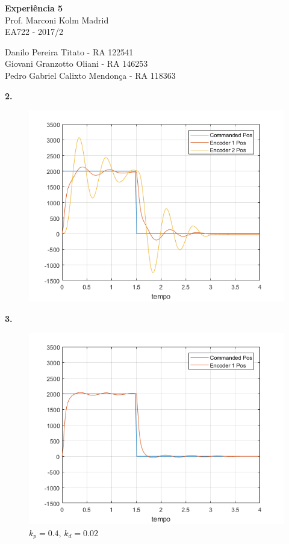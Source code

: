 \documentclass[a4paper,11pt]{article}
\begin{document}
	

\begin{center}
\textbf{Experiência 5} \\
\hspace{5pt}
Prof. Marconi Kolm Madrid \\
EA722 - 2017/2
\end{center}

\begin{center}
Danilo Pereira Titato - RA 122541 \\
Giovani Granzotto Oliani - RA 146253 \\
Pedro Gabriel Calixto Mendonça - RA 118363 \\
\end{center}

\textbf{2.}

\begin{figure}[H]
\includegraphics{q02}
\centering
\end{figure}

\pagebreak

\textbf{3.}

\begin{figure}[H]
\centering
\includegraphics{q03}
\caption{$k_p = 0.4$, $k_d = 0.02$}
\end{figure}
\end{document}
